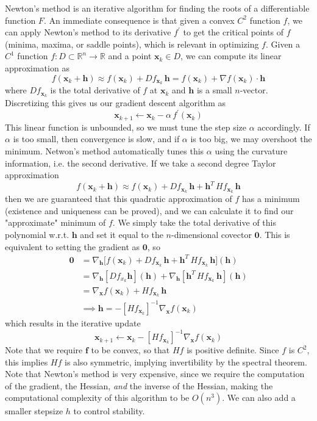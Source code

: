 \documentclass{article}
\theoremstyle{remark}
\theoremstyle{definition}
\begin{document}
Newton's method is an iterative algorithm for finding the roots of a differentiable function $F$. An immediate consequence is that given a convex $C^2$ function $f$, we can apply Newton's method to its derivative $f^\prime$ to get the critical points of $f$ (minima, maxima, or saddle points), which is relevant in optimizing $f$. Given a $C^1$ function $f: D \subset \mathbb{R}^n \longrightarrow \mathbb{R}$ and a point $\mathbf{x}_k \in D$, we can compute its linear approximation as 
\[f(\mathbf{x}_k + \mathbf{h}) \approx f(\mathbf{x}_k) + D f_{\mathbf{x}_k} \, \mathbf{h} = f(\mathbf{x}_k) + \nabla f(\mathbf{x}_k) \cdot \mathbf{h}\]
where $D f_{\mathbf{x}_k}$ is the total derivative of $f$ at $\mathbf{x}_k$ and $\mathbf{h}$ is a small $n$-vector. Discretizing this gives us our gradient descent algorithm as 
\[\mathbf{x}_{k+1} \gets \mathbf{x}_k - \alpha \, f^\prime(\mathbf{x}_k) \]
This linear function is unbounded, so we must tune the step size $\alpha$ accordingly. If $\alpha$ is too small, then convergence is slow, and if $\alpha$ is too big, we may overshoot the minimum. Netwon's method automatically tunes this $\alpha$ using the curvature information, i.e. the second derivative. If we take a second degree Taylor approximation 
\[f(\mathbf{x}_k + \mathbf{h}) \approx f(\mathbf{x}_k) + D f_{\mathbf{x}_k} \, \mathbf{h} + \mathbf{h}^T \, H f_{\mathbf{x}_k} \, \mathbf{h}\]
then we are guaranteed that this quadratic approximation of $f$ has a minimum (existence and uniqueness can be proved), and we can calculate it to find our "approximate" minimum of $f$. We simply take the total derivative of this polynomial w.r.t. $\mathbf{h}$ and set it equal to the $n$-dimensional covector $\mathbf{0}$. This is equivalent to setting the gradient as $\mathbf{0}$, so 
\begin{align*}
    \mathbf{0} & = \nabla_\mathbf{h} \big[ f(\mathbf{x}_k) + D f_{\mathbf{x}_k} \, \mathbf{h} + \mathbf{h}^T \, H f_{\mathbf{x}_k} \, \mathbf{h} \big] (\mathbf{h}) \\
    & = \nabla_\mathbf{h} [ D f_{x_k} \mathbf{h} ] (\mathbf{h}) + \nabla_\mathbf{h} [\mathbf{h}^T \, H f_{\mathbf{x}_k} \, \mathbf{h}] (\mathbf{h}) \\
    & = \nabla_\mathbf{x} f(\mathbf{x}_k) + H f_{\mathbf{x}_k} \, \mathbf{h} \\
    & \implies \mathbf{h} = - [H f_{\mathbf{x}_k}]^{-1} \nabla_\mathbf{x} f(\mathbf{x}_k) 
\end{align*}
which results in the iterative update 
\[\mathbf{x}_{k+1} \gets \mathbf{x}_k - [H f_{\mathbf{x}_k}]^{-1} \nabla_\mathbf{x} f (\mathbf{x}_k)\]
Note that we require $\mathbf{f}$ to be convex, so that $H f$ is positive definite. Since $f$ is $C^2$, this implies $H f$ is also symmetric, implying invertibility by the spectral theorem. Note that Newton's method is very expensive, since we require the computation of the gradient, the Hessian, \textit{and} the inverse of the Hessian, making the computational complexity of this algorithm to be $O(n^3)$. We can also add a smaller stepsize $h$ to control stability. 
\end{document}
